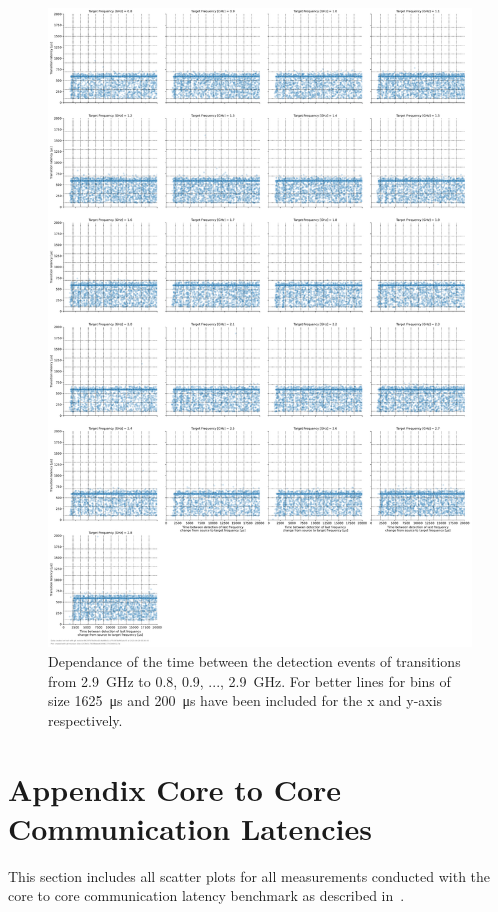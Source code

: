 \begin{figure}[]
    \centering
    \includegraphics[width=\columnwidth]{fig/ftalat/ftalat_scatter_wait_transition_latency_hati_source_2.9.pdf}
    \caption{Dependance of the time between the detection events of transitions from \SI{2.9}{\GHz} to \SI{0.8}{}, \SI{0.9}{}, ..., \SI{2.9}{\GHz}. For better lines for bins of size \SI{1625}{\us} and \SI{200}{\us} have been included for the x and y-axis respectively.}
\end{figure}

\chapter{Appendix Core to Core Communication Latencies}
\label{app:core_to_core_latencies_complete}
This section includes all scatter plots for all measurements conducted with the core to core communication latency benchmark as described in~.

